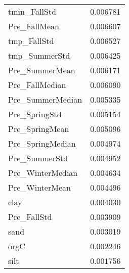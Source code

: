 \begin{tabular}{lr}
tmin_FallStd & 0.006781 \\
Pre_FallMean & 0.006607 \\
tmp_FallStd & 0.006527 \\
tmp_SummerStd & 0.006425 \\
Pre_SummerMean & 0.006171 \\
Pre_FallMedian & 0.006090 \\
Pre_SummerMedian & 0.005335 \\
Pre_SpringStd & 0.005154 \\
Pre_SpringMean & 0.005096 \\
Pre_SpringMedian & 0.004974 \\
Pre_SummerStd & 0.004952 \\
Pre_WinterMedian & 0.004634 \\
Pre_WinterMean & 0.004496 \\
clay & 0.004030 \\
Pre_FallStd & 0.003909 \\
sand & 0.003019 \\
orgC & 0.002246 \\
silt & 0.001756 \\
\bottomrule
\end{tabular}

